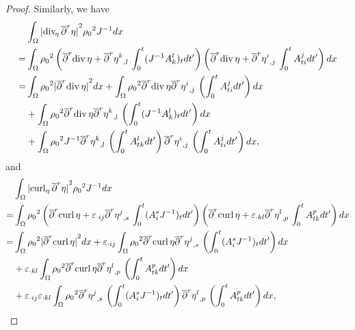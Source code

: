 \documentclass[12pt,twoside,reqno]{amsart}
\numberwithin{equation}{section}
\theoremstyle{definition}
\theoremstyle{remark}
\begin{document}
\begin{proof}
Similarly, we have
\begin{align}\label{eq.dveta4}
  &\int_\Omega {\vert{{\mathrm{div}_{\!\eta}\,}{\overline{\partial}}^r\eta}\vert}^2 {\rho_0}^2  J^{-1}dx\\
  =&\int_\Omega {\rho_0}^2  \left({\overline{\partial}}^r{\mathrm{div}\,}\eta+{\overline{\partial}}^r{{{\eta^k}}_{,{l}}\,}\int_0^t (J^{-1} A^l_{k})_t dt'\right)\left({\overline{\partial}}^r{\mathrm{div}\,}\eta+{{{{\overline{\partial}}^r \eta^i}}_{,{j}}\,}\int_0^t A^j_{ti}dt'\right) dx{\nonumber}\\
  =&\int_\Omega {\rho_0}^2  {\vert{{\overline{\partial}}^r{\mathrm{div}\,}\eta}\vert}^2 dx+\int_\Omega {\rho_0}^2  {\overline{\partial}}^r{\mathrm{div}\,}\eta{\overline{\partial}}^r{{{\eta^i}}_{,{j}}\,}\left(\int_0^t A^j_{ti}dt'\right)dx{\nonumber}\\
  &+\int_\Omega {\rho_0}^2  {\overline{\partial}}^r{\mathrm{div}\,}\eta{\overline{\partial}}^r{{{\eta^k}}_{,{l}}\,}\left(\int_0^t (J^{-1}A^l_{k})_tdt'\right)dx{\nonumber}\\
  &+\int_\Omega{\rho_0}^2  J^{-1}{\overline{\partial}}^r{{{\eta^k}}_{,{l}}\,}\left(\int_0^t A^l_{tk}dt'\right){{{{\overline{\partial}}^r \eta^i}}_{,{j}}\,}\left(\int_0^t A^j_{ti}dt'\right)dx,{\nonumber}
\end{align}
and
\begin{align}\label{eq.curleta4}
  &\int_\Omega {\vert{{\mathrm{curl}_\eta\,}{\overline{\partial}}^r\eta}\vert}^2{\rho_0}^2  J^{-1} dx\\
  =&\int_\Omega {\rho_0}^2 \left({\overline{\partial}}^r{\mathrm{curl}\,} \eta+{\varepsilon}_{\cdot ij}{{{{\overline{\partial}}^r\eta^j}}_{,{s}}\,}\int_0^t(A_i^s J^{-1})_tdt'\right)\left({\overline{\partial}}^r{\mathrm{curl}\,} \eta+{\varepsilon}_{\cdot kl}{{{{\overline{\partial}}^r\eta^l}}_{,{p}}\,}\int_0^t A_{tk}^pdt'\right)dx{\nonumber}\\
  =&\int_\Omega {\rho_0}^2  {\vert{{\overline{\partial}}^r{\mathrm{curl}\,}\eta}\vert}^2  dx+{\varepsilon}_{\cdot ij}\int_\Omega {\rho_0}^2 {\overline{\partial}}^r{\mathrm{curl}\,} \eta {{{{\overline{\partial}}^r\eta^j}}_{,{s}}\,}\left(\int_0^t(A_i^s J^{-1})_tdt'\right)dx{\nonumber}\\
  &+{\varepsilon}_{\cdot kl}\int_\Omega {\rho_0}^2 {\overline{\partial}}^r{\mathrm{curl}\,} \eta {{{{\overline{\partial}}^r\eta^l}}_{,{p}}\,}\left(\int_0^t A_{tk}^pdt'\right)dx{\nonumber}\\
  &+{\varepsilon}_{\cdot ij}{\varepsilon}_{\cdot kl}\int_\Omega {\rho_0}^2 {{{{\overline{\partial}}^r\eta^j}}_{,{s}}\,}\left(\int_0^t(A_i^s J^{-1})_tdt'\right){{{{\overline{\partial}}^r\eta^l}}_{,{p}}\,}\left(\int_0^t A_{tk}^pdt'\right)dx,{\nonumber}

\end{align}
\end{proof}
\end{document}
